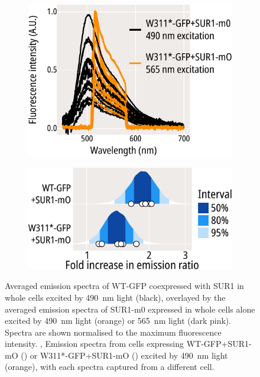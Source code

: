 \begin{figure}[hbtp]
\begin{subfigure}[t]{0.3\textwidth}
		\includegraphics[width=\textwidth]{w311_gfp_mo_spectra_2.pdf}
	\end{subfigure}
	\hfill
	\begin{subfigure}[t]{0.3\textwidth}
		\caption{}\label{ch6fig:gfp_ofp_contrasts_1}
		\centering
		\includegraphics[width=\textwidth]{gfp_ofp_contrasts_1.pdf}
	\end{subfigure}
	\caption[SUR1-mO associates with WT-GFP and W311*-GFP]{
	{\bf{}}
	 Averaged emission spectra of WT-GFP coexpressed with SUR1 in whole cells excited by \SI{490}{\nano\metre} light (black), overlayed by the averaged emission spectra of SUR1-m0 expressed in whole cells alone excited by \SI{490}{\nano\metre} light (orange) or \SI{565}{\nano\metre} light (dark pink).
	Spectra are shown normalised to the maximum fluorescence intensity.
	,  Emission spectra from cells expressing WT-GFP+SUR1-mO () or W311*-GFP+SUR1-mO () excited by \SI{490}{\nano\metre} light (orange), with each spectra captured from a different cell.
}
\end{figure}
